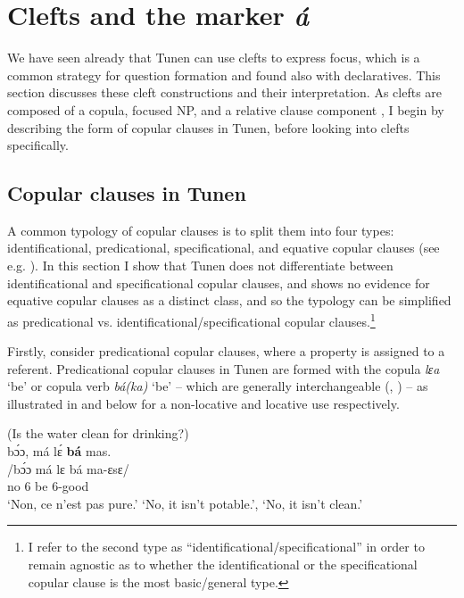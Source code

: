 \documentclass[output=paper,colorlinks,citecolor=brown
]{langscibook}
\begin{document}
\section{Clefts and the marker \textit{á}}\label{secclefts}
We have seen already that Tunen can use clefts to express focus, which is a common strategy for question formation and found also with declaratives. This section discusses these cleft constructions and their interpretation. As clefts are composed of a copula, focused NP, and a relative clause component \citep{HarrisCampbell1995a}, I begin by describing the form of copular clauses in Tunen, before looking into clefts specifically. 

\subsection{Copular clauses in Tunen}
A common typology of copular clauses is to split them into four types: identificational, predicational, specificational, and equative copular clauses (see e.g. \citealt{Higgins1979, Mikkelsen2011, Heycock2012}). In this section I show that Tunen does not differentiate between identificational and specificational copular clauses, and shows no evidence for equative copular clauses as a distinct class, and so the typology can be simplified as predicational vs. identificational/specificational copular clauses.\footnote{I refer to the second type as “identificational\slash specificational” in order to remain agnostic as to whether the identificational or the specificational copular clause is the most basic/general type.}

Firstly, consider predicational copular clauses, where a property is assigned to a referent. Predicational copular clauses in Tunen are formed with the copula \textit{lɛa} `be' or copula verb \textit{bá(ka)} `be' -- which are generally interchangeable (\citealp[347--350]{Dugast1971}, \citealp[124--125]{KerrFut}) -- as illustrated in  and  below for a non-locative  and locative use respectively.
 
\ea
\label{copwaterclean}
(Is the water clean for drinking?) \\
\glll
{\db}bɔ́ɔ,	má lɛ́ \textbf{bá}	mas. \\
/bɔ́ɔ	má lɛ bá	ma-ɛsɛ/  \\
{\db}no	6{}\SM{} \NEG{} be	6-good \\
\glt
`Non, ce n'est pas pure.' `No, it isn't potable.', `No, it isn't clean.' \jambox*{[JO 612]}
\end{document}
